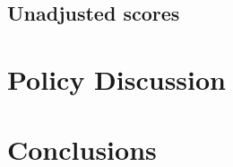 \subsection{Unadjusted scores}

\section{Policy Discussion}\label{sec:policy}

\section{Conclusions}\label{sec:conclusions}






